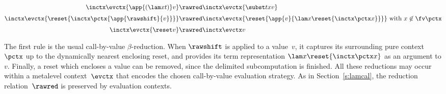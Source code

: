 \documentclass{lmcs}
\theoremstyle{defC}
\begin{document}
\begin{align*}
  \inctx \evctx {\app {(\lam x t)} v} & \rawred
  \inctx \evctx {\subst t x v}
  \\[1mm]
  \inctx \evctx {\reset{\inctx \pctx {\app{\rawshift}{v}}}} & \rawred
  \inctx \evctx {\reset{\app{v}{\lam x {\reset {\inctx \pctx x}}}}}
  \mbox{ with } x \not\in \fv \pctx
  \\[1mm]
  \inctx \evctx {\reset v} & \rawred
  \inctx \evctx v
\end{align*}

\vspace{2mm}\noindent The first rule is the usual call-by-value
$\beta$-reduction. When $\rawshift$ is applied to a value~$v$, it captures its
surrounding pure context $\pctx$ up to the dynamically nearest enclosing reset,
and provides its term representation $\lam x {\reset {\inctx \pctx x}}$ as an
argument to $v$. Finally, a reset which encloses a value can be removed, since
the delimited subcomputation is finished.  All these reductions may occur within
a metalevel context~$\evctx$ that encodes the chosen call-by-value evaluation
strategy. As in Section~\ref{s:lamcal}, the reduction relation~$\rawred$ is
preserved by evaluation contexts.
\end{document}
